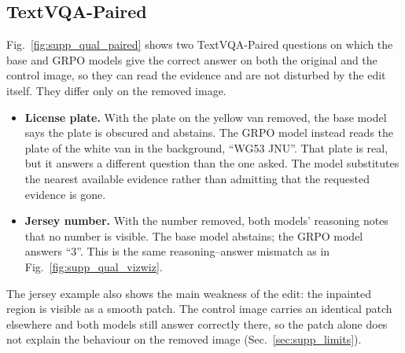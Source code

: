 \subsection{TextVQA-Paired}
\label{sec:supp_qual_paired}

Fig.~\ref{fig:supp_qual_paired} shows two TextVQA-Paired questions on which the base and GRPO
models give the correct answer on both the original and the control image, so they can read
the evidence and are not disturbed by the edit itself. They differ only on the removed image.
\begin{itemize}\itemsep0pt
  \item \textbf{License plate.} With the plate on the yellow van removed, the base model
        says the plate is obscured and abstains. The GRPO model instead reads the plate of
        the white van in the background, ``WG53 JNU''. That plate is real, but it answers a
        different question than the one asked. The model substitutes the nearest available
        evidence rather than admitting that the requested evidence is gone.
  \item \textbf{Jersey number.} With the number removed, both models' reasoning notes that
        no number is visible. The base model abstains; the GRPO model answers ``3''. This is
        the same reasoning--answer mismatch as in Fig.~\ref{fig:supp_qual_vizwiz}.
\end{itemize}
The jersey example also shows the main weakness of the edit: the inpainted region is
visible as a smooth patch. The control image carries an identical patch elsewhere and both
models still answer correctly there, so the patch alone does not explain the behaviour on
the removed image (Sec.~\ref{sec:supp_limits}).

